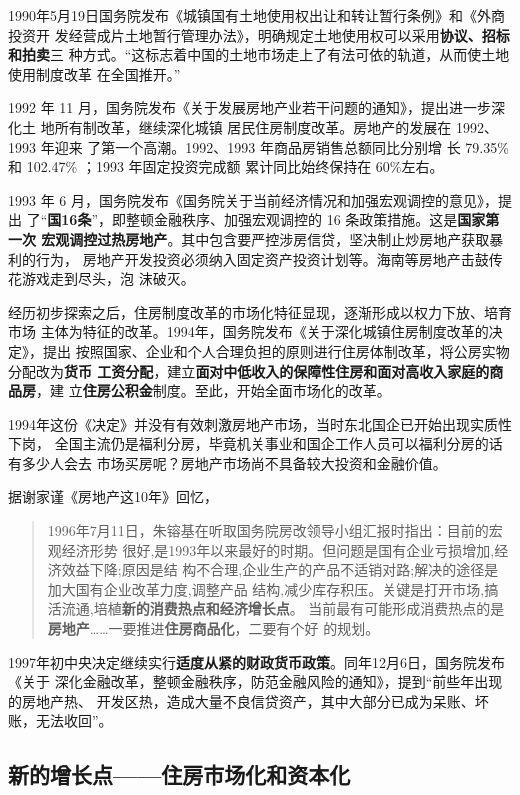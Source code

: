 1990年5月19日国务院发布《城镇国有土地使用权出让和转让暂行条例》和《外商投资开
发经营成片土地暂行管理办法》，明确规定土地使用权可以采用\textbf{协议、招标和拍卖}三
种方式。“这标志着中国的土地市场走上了有法可依的轨道，从而使土地使用制度改革
在全国推开。”


1992 年 11 月，国务院发布《关于发展房地产业若干问题的通知》，提出进一步深化土
地所有制改革，继续深化城镇 居民住房制度改革。房地产的发展在 1992、1993 年迎来
了第一个高潮。1992、1993 年商品房销售总额同比分别增
长 79.35\% 和 102.47\% ；1993 年固定投资完成额 累计同比始终保持在 60\%左右。

1993 年 6 月，国务院发布《国务院关于当前经济情况和加强宏观调控的意见》，提出
了“\textbf{国16条}”，即整顿金融秩序、加强宏观调控的 16 条政策措施。这是\textbf{国家第一次
宏观调控过热房地产}。其中包含要严控涉房信贷，坚决制止炒房地产获取暴利的行为，
房地产开发投资必须纳入固定资产投资计划等。海南等房地产击鼓传花游戏走到尽头，泡
沫破灭。

经历初步探索之后，住房制度改革的市场化特征显现，逐渐形成以权力下放、培育市场
主体为特征的改革。1994年，国务院发布《关于深化城镇住房制度改革的决定》，提出
按照国家、企业和个人合理负担的原则进行住房体制改革，将公房实物分配改为\textbf{货币
  工资分配}，建立\textbf{面对中低收入的保障性住房和面对高收入家庭的商品房}，建
立\textbf{住房公积金}制度。至此，开始全面市场化的改革。\cite{CJZK201802012}

1994年这份《决定》并没有有效刺激房地产市场，当时东北国企已开始出现实质性下岗，
全国主流仍是福利分房，毕竟机关事业和国企工作人员可以福利分房的话有多少人会去
市场买房呢？房地产市场尚不具备较大投资和金融价值。

据谢家谨《房地产这10年》回忆，
\begin{quotation}
  1996年7月11日，朱镕基在听取国务院房改领导小组汇报时指出：目前的宏观经济形势
  很好,是1993年以来最好的时期。但问题是国有企业亏损增加,经济效益下降;原因是结
  构不合理,企业生产的产品不适销对路;解决的途径是加大国有企业改革力度,调整产品
  结构,减少库存积压。关键是打开市场,搞活流通,培植\textbf{新的消费热点和经济增长点}。
  当前最有可能形成消费热点的是\textbf{房地产}……一要推进\textbf{住房商品化}，二要有个好
  的规划。
\end{quotation}

1997年初中央决定继续实行\textbf{适度从紧的财政货币政策}。同年12月6日，国务院发布《关于
深化金融改革，整顿金融秩序，防范金融风险的通知》，提到“前些年出现的房地产热、
开发区热，造成大量不良信贷资产，其中大部分已成为呆账、坏账，无法收回”。

\subsection{新的增长点——住房市场化和资本化}


